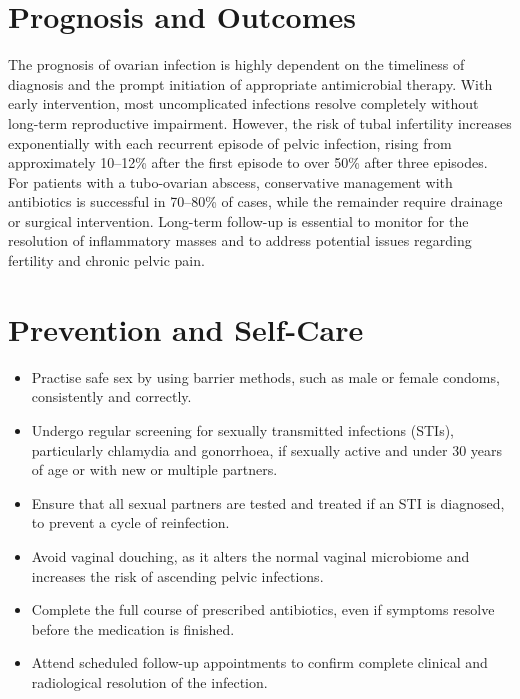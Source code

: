 \section*{Prognosis and Outcomes}
The prognosis of ovarian infection is highly dependent on the timeliness of diagnosis and the prompt initiation of appropriate antimicrobial therapy. With early intervention, most uncomplicated infections resolve completely without long-term reproductive impairment. However, the risk of tubal infertility increases exponentially with each recurrent episode of pelvic infection, rising from approximately 10--12\% after the first episode to over 50\% after three episodes. For patients with a tubo-ovarian abscess, conservative management with antibiotics is successful in 70--80\% of cases, while the remainder require drainage or surgical intervention. Long-term follow-up is essential to monitor for the resolution of inflammatory masses and to address potential issues regarding fertility and chronic pelvic pain.

\section*{Prevention and Self-Care}
\begin{itemize}
    \item Practise safe sex by using barrier methods, such as male or female condoms, consistently and correctly.
    \item Undergo regular screening for sexually transmitted infections (STIs), particularly chlamydia and gonorrhoea, if sexually active and under 30 years of age or with new or multiple partners.
    \item Ensure that all sexual partners are tested and treated if an STI is diagnosed, to prevent a cycle of reinfection.
    \item Avoid vaginal douching, as it alters the normal vaginal microbiome and increases the risk of ascending pelvic infections.
    \item Complete the full course of prescribed antibiotics, even if symptoms resolve before the medication is finished.
    \item Attend scheduled follow-up appointments to confirm complete clinical and radiological resolution of the infection.
\end{itemize}

